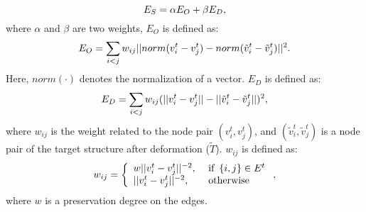 \begin{equation}
    \setlength{\abovedisplayskip}{5pt}
    \setlength{\abovedisplayshortskip}{5pt}
    \setlength{\belowdisplayshortskip}{5pt}
    \setlength{\belowdisplayskip}{5pt}
    E_S = \alpha E_O + \beta E_D, \label{eq:smoothness}
\end{equation}
where $\alpha$ and $\beta$ are two weights,  $E_O$ is defined as:
\begin{equation}
    \setlength{\abovedisplayskip}{5pt}
    \setlength{\abovedisplayshortskip}{5pt}
    \setlength{\belowdisplayshortskip}{5pt}
    \setlength{\belowdisplayskip}{5pt}
    E_O = \sum_{i<j} w_{i j} || norm(v^t_i - v^t_j) - norm(\tilde{v}^t_i - \tilde{v}^t_j)||^2.
\end{equation}
Here, $norm(\cdot)$ denotes the normalization of a vector. $E_D$ is defined as:
\begin{equation}
    \setlength{\abovedisplayskip}{5pt}
    \setlength{\abovedisplayshortskip}{5pt}
    \setlength{\belowdisplayshortskip}{5pt}
    \setlength{\belowdisplayskip}{5pt}
    E_{D} = \sum_{i<j} w_{i j} (|| v^t_i - v^t_j || - || \tilde{v}^t_i - \tilde{v}^t_j ||)^2,
\end{equation}
where $w_{i j}$ is the weight related to the node pair $(v^t_i, v^t_j)$, and $(\tilde{v}^t_i, \tilde{v}^t_j)$ is a node pair of the target structure after deformation ($\tilde{T}$).
$w_{i j}$ is defined as:
\begin{equation}
    \setlength{\abovedisplayskip}{5pt}
    \setlength{\abovedisplayshortskip}{5pt}
    \setlength{\belowdisplayshortskip}{5pt}
    \setlength{\belowdisplayskip}{5pt}
    w_{i j}=\left\{\begin{array}{ll}
    w ||v^t_i - v^t_j||^{-2}, & \text { if } \left\{i, j\right\} \in E^t \\
    ||v^t_i - v^t_j||^{-2}, & \text { otherwise }
\end{array}\right., \label{eq:weight}
\end{equation}
where $w$ is a preservation degree on the edges. 

